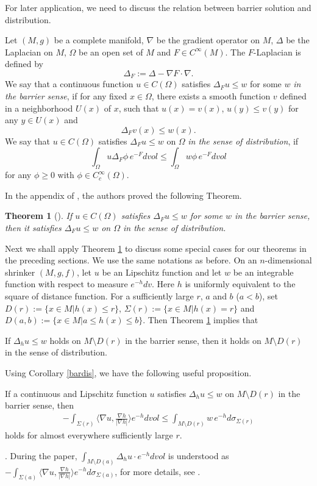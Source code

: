\documentclass[12pt]{amsart}
\newcommand{\Rk}{\noindent {\bf Remark} }
\newtheorem{theo}{Theorem}[section]
\begin{document}
	\smallskip

For later application,  we need to discuss the relation between barrier solution and distribution.

Let $(M,g)$ be a complete manifold, $\nabla$ be the gradient operator on $M$,
$\Delta$ be the Laplacian on $M$, $\Omega$ be an open set of $M$ and
$F\in C^\infty(M)$. The $F$-Laplacian is defined by
\[
\Delta_F:=\Delta-\nabla F\cdot\nabla.
\]
We say that a continuous function $u\in C(\Omega)$ satisfies $\Delta_F u\le w$
for some $w$ \emph{in the barrier sense}, if for any fixed $x\in \Omega$,
there exists a smooth function $v$ defined in a neighborhood $U(x)$ of $x$,
such that $u(x)=v(x)$, $u(y)\le v(y)$ for any $y\in U(x)$ and
\[
\Delta_F v(x)\le w(x).
\]
We say that $u\in C(\Omega)$ satisfies $\Delta_F u\le w$ on $\Omega$
\emph{in the sense of distribution}, if
\[
\int_{\Omega} u\Delta_F\phi\, e^{-F}dvol\leq \int_{\Omega} w \phi\, e^{-F}dvol
\]
for any $\phi\geq 0$ with $\phi\in C_c^\infty(\Omega)$.

In the appendix of \cite{Wu-Wu}, the authors proved the following Theorem.
\begin{theo}[\cite{Wu-Wu}]\label{bard}
If $u\in C(\Omega)$ satisfies $\Delta_F u\le w$ for some $w$
in the barrier sense, then it satisfies $\Delta_F u\le w$ on $\Omega$ in
the sense of distribution.
\end{theo}
Next we shall apply Theorem \ref{bard} to discuss some special cases for our
theorems in the preceding sections. We use the same notations as before. On
an $n$-dimensional shrinker $(M,g,f)$, let $u$ be an
 Lipschitz function and let $w$ be an integrable function
with respect to measure $e^{-h}dv$. Here $h$ is uniformly equivalent to the square of
distance function. For a sufficiently large
$r$, $a$ and $b$ ($a<b$), set $D(r):=\{x\in M|h(x)\le r\}$,
$\Sigma(r):=\{x\in M|h(x)=r\}$ and $D(a,b):=\{x\in M|a\le h(x)\le b\}$.
Then Theorem \ref{bard} implies that
\begin{coro}[\cite{Wu-Wu}]\label{bardis}
If $\Delta_h u\le w$ holds on $M\setminus D(r)$ in the barrier sense, then it
holds on $M\setminus D(r)$ in the sense of distribution.
\end{coro}
Using Corollary \ref{bardis}, we have the following useful proposition.
\begin{prop}[\cite{Wu-Wu}]\label{keyprop}
If a continuous and Lipschitz function $u$ satisfies $\Delta_h u\le w$
on $M\setminus D(r)$ in the barrier sense, then
\begin{align*}
-\int_{\Sigma(r)}\langle\nabla u, \tfrac{\nabla h}{|\nabla h|}\rangle e^{-h}dvol\le \int_{M\setminus D(r)} w\, e^{-h} d\sigma_{\Sigma(r)}
\end{align*}
holds for almost everywhere sufficiently large $r$.
\end{prop}
\Rk. During the paper,  $\int_{M\setminus D(a)} \Delta_h u\cdot e^{-h}dvol$ is understood as $-\int_{\Sigma(a)}\langle \nabla u, \frac{\nabla h}{|\nabla h|}\rangle e^{-h} d\sigma_{\Sigma(a)}$, for more details, see \cite{Wu-Wu}.
\end{document}
